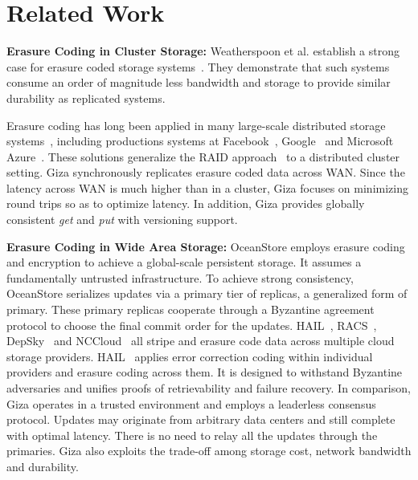 \section{Related Work}


{\bf Erasure Coding in Cluster Storage:}
Weatherspoon et al. establish a strong case for erasure coded storage
systems~\cite{weatherspoon02erasure}. They demonstrate that such systems consume
an order of magnitude less bandwidth and storage to provide similar durability
as replicated systems.

Erasure coding has long been applied in many large-scale distributed storage
systems~\cite{fab:asplos04, zhang04repstore, haeberlen05glacier, abd05ursa,
  welch08scalable, sathiamoorthy13xoring, zhang16efficient}, including
productions systems at Facebook~\cite{borthakur2010hdfs},
Google~\cite{fikes2010storage, ford10availability} and Microsoft
Azure~\cite{huang12erasure}. These solutions generalize the RAID
approach~\cite{patterson88case, wilkes96hp} to a distributed cluster setting.
Giza synchronously replicates erasure coded data across WAN. Since the latency
across WAN is much higher than in a cluster, Giza focuses on minimizing round
trips so as to optimize latency. In addition, Giza provides globally consistent
{\em get} and {\em put} with versioning support.

{\bf Erasure Coding in Wide Area Storage:}
OceanStore \cite{oceanstore:asplos00, pond:fast03} employs erasure coding and
encryption to achieve a global-scale persistent storage. It assumes a
fundamentally untrusted infrastructure. To achieve strong consistency,
OceanStore serializes updates via a primary tier of replicas, a generalized form
of primary. These primary replicas cooperate through a Byzantine agreement
protocol to choose the final commit order for the updates. 
HAIL~\cite{hail:ccs09}, RACS~\cite{racs:socc10}, DepSky~\cite{depsky:eurosys11} and
NCCloud~\cite{nccloud:fast12} all stripe and erasure code data across multiple
cloud storage providers. HAIL~\cite{hail:ccs09} applies error correction coding
within individual providers and erasure coding across them. It is designed to
withstand Byzantine adversaries and unifies proofs of retrievability and failure
recovery. In comparison, Giza operates in a trusted environment and employs a
leaderless consensus protocol. Updates may originate from arbitrary data centers
and still complete with optimal latency. There is no need to relay all the
updates through the primaries. Giza also exploits the trade-off among storage
cost, network bandwidth and durability.

